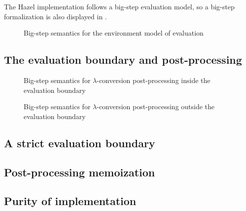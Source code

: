 The Hazel implementation follows a big-step evaluation model, so a big-step formalization is also displayed in .

\begin{figure}
  \centering
  \begin{mdframed}
    \begin{singlespace}
      
    \end{singlespace}
  \end{mdframed}
  \caption{Big-step semantics for the environment model of evaluation}
  \label{fig:big-step-formal}
\end{figure}




\subsection{The evaluation boundary and post-processing}
\label{sec:closures_to_lambdas}


\begin{figure}
  \centering
  \begin{mdframed}
    \begin{singlespace}
      
    \end{singlespace}
  \end{mdframed}
  \caption{Big-step semantics for $\lambda$-conversion post-processing inside the evaluation boundary}
  \label{fig:big-step-inside-formal}
\end{figure}

\begin{figure}
  \centering
  \begin{mdframed}
    \begin{singlespace}
      
    \end{singlespace}
  \end{mdframed}
  \caption{Big-step semantics for $\lambda$-conversion post-processing outside the evaluation boundary}
  \label{fig:big-step-outside-formal}
\end{figure}

\subsection{A strict evaluation boundary}
\label{sec:strict_eval_boundary}

\subsection{Post-processing memoization}
\label{sec:memoization}

\subsection{Purity of implementation}
\label{sec:env_purity}

